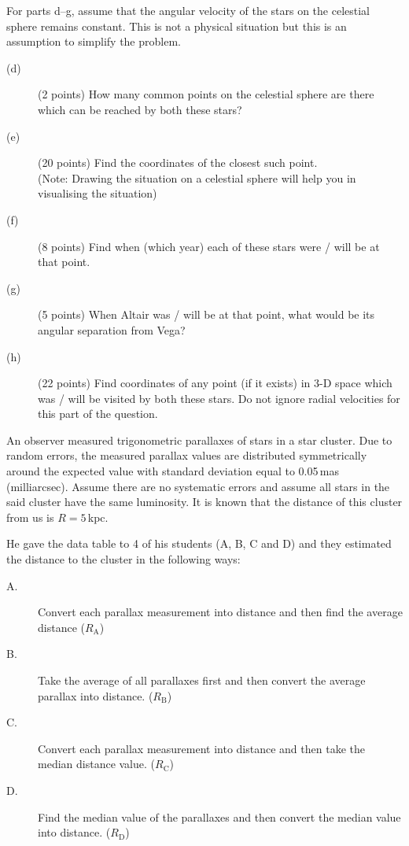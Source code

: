 For parts d--g, assume that the angular velocity of the stars on the celestial
sphere remains constant. This is not a physical situation but this is an
assumption to simplify the problem.

\begin{description}
\item[(d)] (2 points) How many common points on the celestial sphere are there
  which can be reached by both these stars?
\item[(e)] (20 points) Find the coordinates of the closest such point.\\
  (Note: Drawing the situation on a celestial sphere will help you in
  visualising the situation)
\item[(f)] (8 points) Find when (which year) each of these stars were / will be
  at that point.
\item[(g)] (5 points) When Altair was / will be at that point, what would be
  its angular separation from Vega?
\item[(h)] (22 points) Find coordinates of any point (if it exists) in 3-D
  space which was / will be visited by both these stars. Do not ignore radial
  velocities for this part of the question.
\end{description}

An observer measured trigonometric parallaxes of stars in a star cluster. Due
to random errors, the measured parallax values are distributed symmetrically
around the expected value with standard deviation equal to 0.05\,mas
(milliarcsec). Assume there are no systematic errors and assume all stars in
the said cluster have the same luminosity. It is known that the distance of
this cluster from us is $R = 5$\,kpc.

He gave the data table to 4 of his students (A, B, C and D) and they estimated
the distance to the cluster in the following ways:

\begin{description}
\item[A.] Convert each parallax measurement into distance and then find the
  average distance ($R_{\mathrm{A}}$)
\item[B.] Take the average of all parallaxes first and then convert the average
  parallax into distance. ($R_{\mathrm{B}}$)
\item[C.] Convert each parallax measurement into distance and then take the
  median distance value. ($R_{\mathrm{C}}$)
\item[D.] Find the median value of the parallaxes and then convert the median
  value into distance. ($R_{\mathrm{D}}$)
\end{description}

